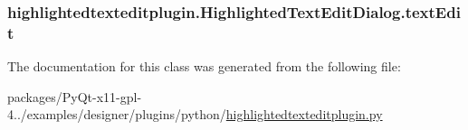 \subsubsection[{text\+Edit}]{\setlength{\rightskip}{0pt plus 5cm}highlightedtexteditplugin.\+Highlighted\+Text\+Edit\+Dialog.\+text\+Edit}\label{classhighlightedtexteditplugin_1_1HighlightedTextEditDialog_a04a2c07ea4bd833e7c458ab676726087}


The documentation for this class was generated from the following file\+:\begin{DoxyCompactItemize}
\item 
packages/\+Py\+Qt-\/x11-\/gpl-\/4../examples/designer/plugins/python/\hyperlink{highlightedtexteditplugin_8py}{highlightedtexteditplugin.\+py}\end{DoxyCompactItemize}
